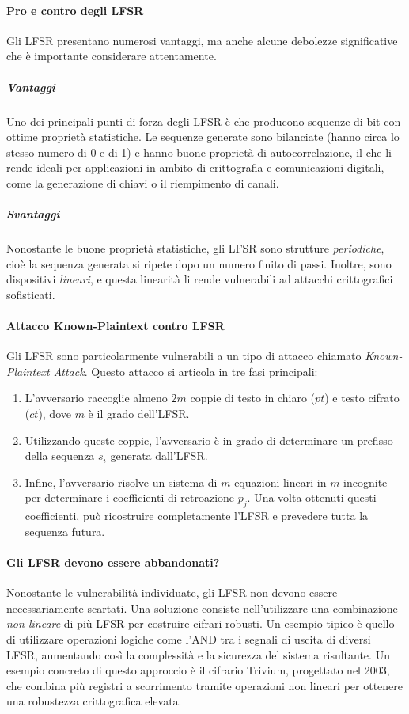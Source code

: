 \documentclass{report}
\begin{document}
\paragraph{Pro e contro degli LFSR}
Gli LFSR presentano numerosi vantaggi, ma anche alcune debolezze significative che è importante considerare attentamente.

\subparagraph{Vantaggi}
Uno dei principali punti di forza degli LFSR è che producono sequenze di bit con ottime proprietà statistiche. Le sequenze generate sono bilanciate (hanno circa lo stesso numero di 0 e di 1) e hanno buone proprietà di autocorrelazione, il che li rende ideali per applicazioni in ambito di crittografia e comunicazioni digitali, come la generazione di chiavi o il riempimento di canali.

\subparagraph{Svantaggi}
Nonostante le buone proprietà statistiche, gli LFSR sono strutture \emph{periodiche}, cioè la sequenza generata si ripete dopo un numero finito di passi. Inoltre, sono dispositivi \emph{lineari}, e questa linearità li rende vulnerabili ad attacchi crittografici sofisticati.

\paragraph{Attacco Known-Plaintext contro LFSR}
Gli LFSR sono particolarmente vulnerabili a un tipo di attacco chiamato \emph{Known-Plaintext Attack}. Questo attacco si articola in tre fasi principali:
\begin{enumerate}
    \item L'avversario raccoglie almeno $2m$ coppie di testo in chiaro ($pt$) e testo cifrato ($ct$), dove $m$ è il grado dell'LFSR.
    \item Utilizzando queste coppie, l'avversario è in grado di determinare un prefisso della sequenza $s_i$ generata dall'LFSR.
    \item Infine, l'avversario risolve un sistema di $m$ equazioni lineari in $m$ incognite per determinare i coefficienti di retroazione $p_j$. Una volta ottenuti questi coefficienti, può ricostruire completamente l'LFSR e prevedere tutta la sequenza futura.
\end{enumerate}

\paragraph{Gli LFSR devono essere abbandonati?}
Nonostante le vulnerabilità individuate, gli LFSR non devono essere necessariamente scartati. Una soluzione consiste nell'utilizzare una combinazione \emph{non lineare} di più LFSR per costruire cifrari robusti. Un esempio tipico è quello di utilizzare operazioni logiche come l'AND tra i segnali di uscita di diversi LFSR, aumentando così la complessità e la sicurezza del sistema risultante. Un esempio concreto di questo approccio è il cifrario Trivium, progettato nel 2003, che combina più registri a scorrimento tramite operazioni non lineari per ottenere una robustezza crittografica elevata.
\end{document}
